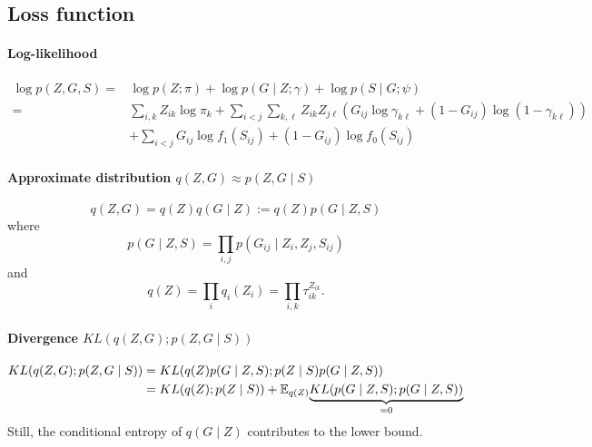 
\subsection{Loss function}

\paragraph{Log-likelihood}
\begin{align*}
 \log p(Z, G, S) 
 = & \log p(Z; \pi) + \log p(G \mid Z; \gamma) + \log p(S \mid G; \psi) \\
 = & \sum_{i, k} Z_{ik} \log \pi_k 
 + \sum_{i < j} \sum_{k, \ell} Z_{ik} Z_{j\ell} \left(G_{ij} \log \gamma_{k\ell} + (1 - G_{ij}) \log (1 - \gamma_{k\ell})\right) \\
 & + \sum_{i < j} G_{ij} \log f_1(S_{ij}) + (1 - G_{ij}) \log f_0(S_{ij})
\end{align*}

\paragraph{Approximate distribution $q(Z, G) \approx p(Z, G \mid S)$}
\begin{equation}
q(Z, G) = q(Z) q(G \mid Z) := q(Z) p(G \mid Z, S)
\end{equation}
where
$$
p(G \mid Z, S) = \prod_{i, j} p(G_{ij} \mid Z_i, Z_j, S_{ij})
$$
and
$$
q(Z) = \prod_i q_i(Z_i) = \prod_{i, k} \tau_{ik}^{Z_{ik}}.
$$

\paragraph{Divergence $KL(q(Z, G) ; p(Z, G \mid S))$}
\begin{align*}
KL(q(Z, G) ; p(Z, G \mid S)) 
& = KL(q(Z) p(G \mid Z, S); p(Z \mid S) p(G \mid Z, S)) \\
& = KL(q(Z); p(Z \mid S)) 
+ \mathbb E_{q(Z)} \underset{=0}{\underbrace{KL(p(G \mid Z, S); p(G \mid Z, S))}}
\end{align*}
Still, the conditional entropy of $q(G \mid Z)$ contributes to the lower bound.


